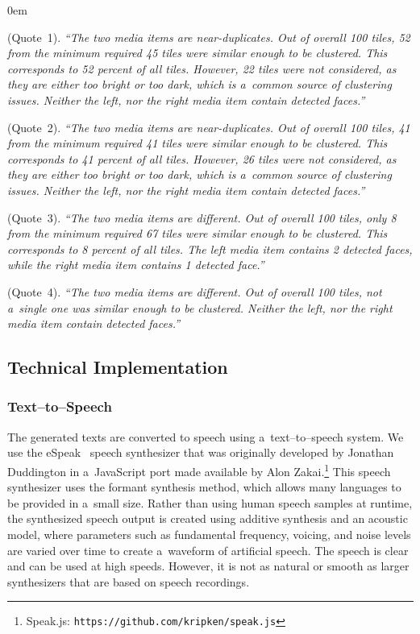 \documentclass{article}
\begin{document}
\begin{description}
  \itemsep0em
  \item[Clustering Consent] (Quote~1). \textit{``The two media items are near-duplicates. Out of overall 100 tiles, 52 from the minimum required 45 tiles
      were similar enough to be clustered. This corresponds to 52 percent of all tiles. However, 22 tiles were not considered, as they are either too bright or too dark, which is a~common source of clustering issues. Neither the left, nor the right media item contain detected faces.''}
  \item[Clustering Dissent] (Quote~2). \textit{``The two media items are near-duplicates. Out of overall 100 tiles, 41 from the minimum required 41 tiles were similar enough to be clustered. This corresponds to 41 percent of all tiles. However, 26 tiles were not considered, as they are either too bright
      or too dark, which is a~common source of clustering issues. Neither the left, nor the right media item contain detected faces.''}
  \item[Non-Clustering Dissent] (Quote~3). \textit{``The two media items are different. Out of overall 100 tiles, only 8 from the minimum required 67 tiles
      were similar enough to be clustered. This corresponds to 8 percent of all tiles. The left media item contains 2 detected faces, while the right media item contains 1 detected face.''}
  \item[(Non-Clustering Consent)] (Quote~4). \textit{``The two media items are different. Out of overall 100 tiles, not a~single one was similar enough to be clustered. Neither the left, nor the right media item contain detected faces.''}
\end{description}

\subsection{Technical Implementation}

\subsubsection{Text--to--Speech}
The generated texts are converted to speech using a~text--to--speech system. We use the eSpeak~\cite{duddington2012espeak} speech synthesizer that was originally developed by Jonathan Duddington in a~JavaScript port made available by Alon Zakai.\footnote{Speak.js: \texttt{https://github.com/kripken/speak.js}} This speech synthesizer uses the formant synthesis method, which allows many languages to be provided in a~small size. Rather than using human speech samples at runtime, the synthesized speech output is created using additive synthesis and an acoustic model, where parameters such as fundamental frequency, voicing, and noise levels
are varied over time to create a~waveform of artificial speech. The speech is clear and can be used at high speeds. However, it is not as natural or smooth as larger synthesizers that are based on speech recordings.
\end{document}
